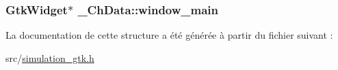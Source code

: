 \subsubsection[{\texorpdfstring{window\+\_\+main}{window_main}}]{\setlength{\rightskip}{0pt plus 5cm}Gtk\+Widget$\ast$ \+\_\+\+Ch\+Data\+::window\+\_\+main}\hypertarget{struct__ChData_a2765de28df11e98c4db8fe24ce15277e}{}\label{struct__ChData_a2765de28df11e98c4db8fe24ce15277e}


La documentation de cette structure a été générée à partir du fichier suivant \+:\begin{DoxyCompactItemize}
\item 
src/\hyperlink{simulation__gtk_8h}{simulation\+\_\+gtk.\+h}\end{DoxyCompactItemize}
